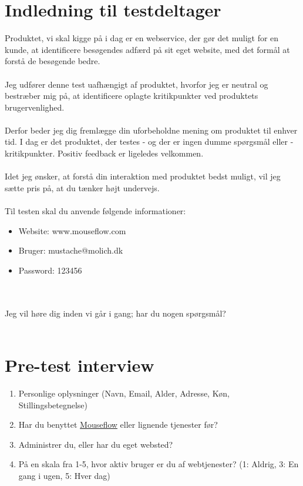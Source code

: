 \documentclass{article}
\begin{document}
\section*{Indledning til testdeltager}
Produktet, vi skal kigge på i dag er en webservice, der gør det muligt for en kunde, at identificere besøgendes adfærd på sit eget website, med det formål at forstå de besøgende bedre. 
\\
\\
Jeg udfører denne test uafhængigt af produktet, hvorfor jeg er neutral og bestræber mig på, at identificere oplagte kritikpunkter ved produktets brugervenlighed. 
\\
\\
Derfor beder jeg dig fremlægge din uforbeholdne mening om produktet til enhver tid. I dag er det produktet, der testes - og der er ingen dumme spørgsmål eller -kritikpunkter. Positiv feedback er ligeledes velkommen. 
\\
\\
Idet jeg ønsker, at forstå din interaktion med produktet bedst muligt, vil jeg sætte pris på, at du tænker højt undervejs. 
\\
\\
Til testen skal du anvende følgende informationer:
\begin{itemize}
	\item Website: www.mouseflow.com
	\item Bruger: mustache@molich.dk
	\item Password: 123456
\end{itemize}
\\
\\
Jeg vil høre dig inden vi går i gang; har du nogen spørgsmål?
\\
\\
\section*{Pre-test interview}
\begin{enumerate}
	\item Personlige oplysninger (Navn, Email, Alder, Adresse, Køn, Stillingsbetegnelse)  
	\item Har du benyttet \href{http://mouseflow.com}{Mouseflow} eller lignende tjenester før?
	\item Administrer du, eller har du eget websted?
	\item På en skala fra 1-5, hvor aktiv bruger er du af webtjenester? (1: Aldrig, 3: En gang i ugen, 5: Hver dag)
\end{enumerate}
\end{document}
